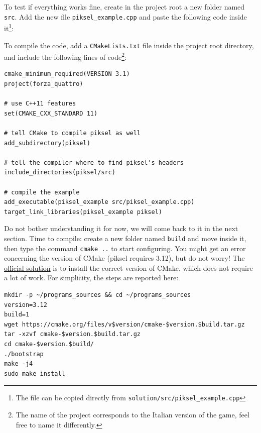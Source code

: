 \documentclass{article}
\begin{document}
To test if everything works fine, create in the project root a new folder named \texttt{src}. Add the new file \texttt{piksel\string_example.cpp} and paste the following code inside it\footnote{The file can be copied directly from \texttt{solution/src/piksel\string_example.cpp}}:




To compile the code, add a \texttt{CMakeLists.txt} file inside the project root directory, and include the following lines of code\footnote{The name of the project corresponds to the Italian version of the game, feel free to name it differently.}:

\begin{lstlisting}[style=mycmake]
cmake_minimum_required(VERSION 3.1)
project(forza_quattro)

# use C++11 features
set(CMAKE_CXX_STANDARD 11)

# tell CMake to compile piksel as well
add_subdirectory(piksel)

# tell the compiler where to find piksel's headers
include_directories(piksel/src)

# compile the example
add_executable(piksel_example src/piksel_example.cpp)
target_link_libraries(piksel_example piksel)
\end{lstlisting}

Do not bother understanding it for now, we will come back to it in the next section. Time to compile: create a new folder named \texttt{build} and move inside it, then type the command \texttt{cmake~..} to start configuring. You might get an error concerning the version of CMake (piksel requires 3.12), but do not worry! The \href{https://bernhardfritz.github.io/piksel/#/gettingstarted/troubleshooting}{official solution} is to install the correct version of CMake, which does not require a lot of work. For simplicity, the steps are reported here:

\begin{center}
\begin{minipage}{.9\textwidth}
\begin{lstlisting}[style=myterm]
mkdir -p ~/programs_sources && cd ~/programs_sources
version=3.12
build=1
wget https://cmake.org/files/v$version/cmake-$version.$build.tar.gz
tar -xzvf cmake-$version.$build.tar.gz
cd cmake-$version.$build/
./bootstrap
make -j4
sudo make install
\end{lstlisting}
\end{minipage}
\end{center}
\end{document}
